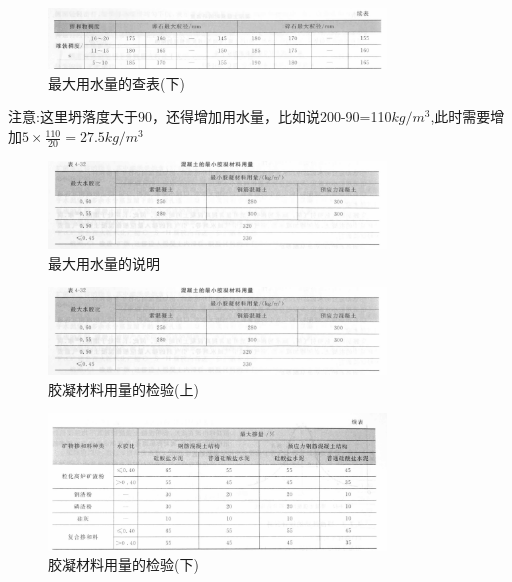 \documentclass[12pt, a4paper, oneside, UTF8]{ctexbook}
\begin{document}
\begin{figure}[H]
	\centering
	\includegraphics[width=0.8\textwidth]{../figure/7.png}
	\caption{最大用水量的查表(下)}
	\label{fig:min_water_check_lower}
\end{figure}

\begin{remark}
	注意:这里坍落度大于90，还得增加用水量，比如说200-90=110$kg/m^3$,此时需要增加$5\times \frac{110}{20}=27.5kg/m^3$
\end{remark}

\begin{figure}[H]
	\centering
	\includegraphics[width=0.8\textwidth]{../figure/3.png}
	\caption{最大用水量的说明}
	\label{fig:min_water_explanation}
\end{figure}

\begin{figure}[H]
	\centering
	\includegraphics[width=0.8\textwidth]{../figure/3.png}
	\caption{胶凝材料用量的检验(上)}
	\label{fig:cementitious_material_check_upper}
\end{figure}

\begin{figure}[H]
	\centering
	\includegraphics[width=0.8\textwidth]{../figure/4.png}
	\caption{胶凝材料用量的检验(下)}
	\label{fig:cementitious_material_check_lower}
\end{figure}
\end{document}
